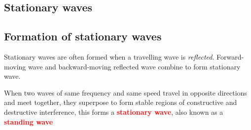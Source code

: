 \documentclass[a4paper,12pt]{book}
\newenvironment{ilight}
  {\centering
  	\vspace*{6pt}
  	\begin{tcolorbox}[colframe=Gray,colback=LightGrey!15]
  \setlength{\baselineskip}{\baselineskip}%
  }
  {\end{tcolorbox}\vspace*{-4pt}}
\newcommand{\keypoint}[1]{\textbf{\textcolor{red}{#1}}}
\newcommand{\keypoint}[1]{\textbf{\textcolor{red}{#1}}}
\begin{document}

\newpage

\subsection{Stationary waves}

\subsection{Formation of stationary waves}

Stationary waves are often formed when a travelling wave is \emph{reflected}. Forward-moving wave and backward-moving reflected wave combine to form stationary wave.

\begin{ilight}
	When two waves of same frequency and same speed travel in opposite directions and meet together, they superpose to form stable regions of constructive and destructive interference, this forms a \keypoint{stationary wave}, also known as a \keypoint{standing wave}
\end{ilight}
\end{document}
